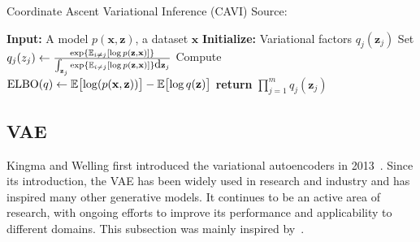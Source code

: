 \begin{algorithm}
    \caption[CAVI algorithm]{Coordinate Ascent Variational Inference (CAVI) Source: \cite{intro-variational-blog-2019}}
    \label{alg:cavi}
    \begin{algorithmic}[1]
      \State \textbf{Input:} A model $p(\mathbf{x},\mathbf{z})$, a dataset $\mathbf{x}$
      \State \textbf{Initialize:} Variational factors $q_j(\mathbf{z}_j)$
          \State Set $q_j(z_j) \gets \frac{\exp{\operatorname{\mathbb{E}}_{i \neq j} [\log p(\mathbf{z},\mathbf{x})]}}{\int_{\mathbf{z}_j}\exp{\operatorname{\mathbb{E}}_{i \neq j} [\log p(\mathbf{z},\mathbf{x})]}\mbox{\rm d}\mathbf{z}_j}$
        \EndFor
        \State Compute $\mathrm{ELBO}(q) \gets \operatorname{\mathbb{E}} \bigl[\log(p(\mathbf{x},\mathbf{z}))\bigr] - \operatorname{\mathbb{E}} \bigl[ \log q(\mathbf{z}) \bigr]$
      \EndWhile
      \State \textbf{return} $\prod_{j=1}^m q_j(\mathbf{z}_j)$
    \end{algorithmic}
\end{algorithm}

\subsection{VAE}
\label{subsec:vaes}
Kingma and Welling first introduced the variational autoencoders in 2013~\cite{vae-original-2013}. Since its introduction, the VAE 
has been widely used in research and industry and has inspired many other generative models. It continues to be an active area of research, with 
ongoing efforts to improve its performance and applicability to different domains. This subsection was mainly inspired by~\cite{intro-vae-2019}.

